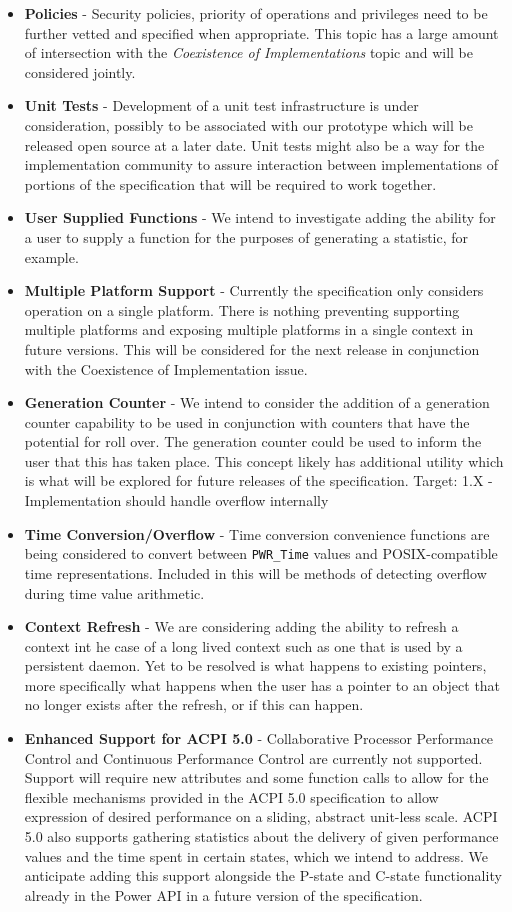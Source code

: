 \begin{itemize}[noitemsep,nolistsep]
\item{\textbf{Policies} - Security policies, priority of operations and privileges need to be further vetted and specified when appropriate. This topic has a large amount of intersection with the \textit{Coexistence of Implementations} topic and will be considered jointly.
}
\item{\textbf{Unit Tests} - Development of a unit test infrastructure is under consideration, possibly to be associated with our prototype which will be released open source at a later date. Unit tests might also be a way for the implementation community to assure interaction between implementations of portions of the specification that will be required to work together.
}
\item{\textbf{User Supplied Functions} - We intend to investigate adding the ability for a user to supply a function for the purposes of generating a statistic, for example.
}
\item{\textbf{Multiple Platform Support} - Currently the specification only considers operation on a single platform. There is nothing preventing supporting multiple platforms and exposing multiple platforms in a single context in future versions. This will be considered for the next release in conjunction with the Coexistence of Implementation issue.
}
\item{\textbf{Generation Counter} - We intend to consider the addition of a generation counter capability to be used in conjunction with counters that have the potential for roll over. The generation counter could be used to inform the user that this has taken place. This concept likely has additional utility which is what will be explored for future releases of the specification. Target: 1.X - Implementation should handle overflow internally
}
\item{\textbf{Time Conversion/Overflow} - Time conversion convenience functions are being considered to convert between \texttt{PWR_Time} values and POSIX-compatible time representations. Included in this will be methods of detecting overflow during time value arithmetic.
}
\item{\textbf{Context Refresh} - We are considering adding the ability to refresh a context int he case of a long lived context such as one that is used by a persistent daemon. Yet to be resolved is what happens to existing pointers, more specifically what happens when the user has a pointer to an object that no longer exists after the refresh, or if this can happen. 
}
\item{\textbf{Enhanced Support for ACPI 5.0} - Collaborative Processor Performance Control and Continuous Performance Control are currently not supported. Support will require new attributes and some function calls to allow for the flexible mechanisms provided in the ACPI 5.0 specification to allow expression of desired performance on a sliding, abstract unit-less scale. ACPI 5.0 also supports gathering statistics about the delivery of given performance values and the time spent in certain states, which we intend to address. We anticipate adding this support alongside the P-state and C-state functionality already in the Power API in a future version of the specification. 
}
\end{itemize}
